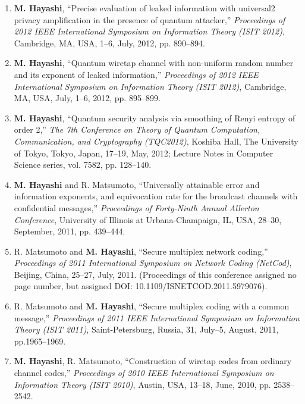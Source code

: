 \documentclass[a4paper,12pt,oneside]{article}
\begin{document}
\begin{enumerate}
    \item
    \textbf{M. Hayashi}, 
    ``Precise evaluation of leaked information with universal2 privacy amplification in the presence of quantum attacker,'' 
    {\em Proceedings of 2012 IEEE International Symposium on Information Theory (ISIT 2012)}, 
    Cambridge, MA, USA, 1--6, July, 2012, pp. 890--894. 
    
    \item	\textbf{M. Hayashi}, 
    ``Quantum wiretap channel with non-uniform random number and its exponent of leaked information,'' 
    {\em Proceedings of 2012 IEEE International Symposium on Information Theory (ISIT 2012)}, 
    Cambridge, MA, USA, July, 1--6, 2012, pp. 895--899. 
    
    \item	\textbf{M. Hayashi}, 
    ``Quantum security analysis via smoothing of Renyi entropy of order 2,''
    {\em The 7th Conference on Theory of Quantum Computation, Communication, and Cryptography (TQC2012)}, 
    Koshiba Hall, The University of Tokyo, Tokyo, Japan, 17--19, May, 2012; 
    Lecture Notes in Computer Science series, vol. 7582, pp. 128--140.
    
    \item	\textbf{M. Hayashi} and R. Matsumoto, 
    ``Universally attainable error and information exponents, and equivocation rate for the broadcast channels with confidential messages,''
    {\em Proceedings of Forty-Ninth Annual Allerton Conference}, 
    University of Illinois at Urbana-Champaign, IL, USA, 28--30, September, 2011, pp. 439--444. 
    
    \item	R. Matsumoto and \textbf{M. Hayashi}, 
    ``Secure multiplex network coding,'' 
    {\em Proceedings of 2011 International Symposium on Network Coding (NetCod)}, 
    Beijing, China, 25--27, July, 2011.
    (Proceedings of this conference assigned no page number, but assigned DOI: 10.1109/ISNETCOD.2011.5979076).
    
    \item R. Matsumoto and \textbf{M. Hayashi}, 
    ``Secure multiplex coding with a common message,'' 
    {\em Proceedings of 2011 IEEE International Symposium on Information Theory (ISIT 2011)}, 
    Saint-Petersburg, Russia, 31, July--5, August, 2011, pp.1965--1969.
    
    \item	\textbf{M. Hayashi}, R. Matsumoto, 
    ``Construction of wiretap codes from ordinary channel codes,'' 
    {\em Proceedings of 2010 IEEE International Symposium on Information Theory (ISIT 2010)}, 
    Austin, USA, 13--18, June, 2010, pp. 2538--2542.
    

\end{enumerate}
\end{document}
